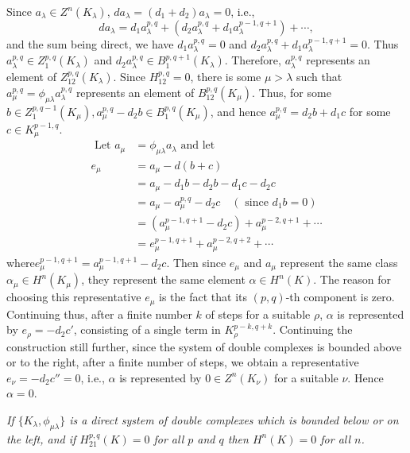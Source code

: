   Since $a_\lambda \in Z^n (K_{\lambda})$,  $d a_\lambda = (d_1 + d_2) 
  a_{\lambda} = 0$, i.e., 
  $$
  d a_{\lambda} = d_1 a^{p,q}_{\lambda} + (d_2 a^{p,q}_{\lambda} + d_1
  a^{p-1, q+1}_{\lambda}) + \cdots , 
  $$
  and the sum being direct, we have $d_1 a^{p,q}_{\lambda} = 0$ and
  $d_2 a^{p,q}_{\lambda} + d_1 a^{p-1 , q+1}_{\lambda} = 0$. Thus
  $a^{p,q}_{\lambda} \in Z^{p,q}_1(K_\lambda)$ and $d_2
  a^{p,q}_{\lambda} \in B^{p,q+1}_{1} (K_\lambda)$. Therefore,
  $a^{p,q}_{\lambda}$ represents an element of
  $Z^{p,q}_{12}(K_\lambda)$. Since $H^{p,q}_{12} = 0$, there is some
  $\mu > \lambda$ such that $a^{p,q}_{\mu} = \phi_{\mu \lambda}
  a^{p,q}_{\lambda}$ represents an element of
  $B^{p,q}_{12}(K_\mu)$. Thus, for some $b \in Z^{p,q-1}_{1}(K_\mu),
  a^{p,q}_{\mu} - d_2 b \in B^{p,q}_1 (K_\mu)$, and hence
  $a^{p,q}_{\mu} = d_2 b + d_1 c$ for some $c \in K^{p-1,q}_{\mu}$. 
  \begin{align*}
\text{ Let } a_{\mu} & = \phi_{\mu \lambda} a_{\lambda} \text{ and
  let } \\ 
e_{\mu} & = a_{\mu }- d (b + c) \\
& = a_{\mu }- d_1 b - d_2 b-d_1 c-d_2 c \\
& = a_{\mu } - a^{p,q}_{\mu} - d_2 c  \quad (\text { since } d_1 b = 0)\\
 &= (a^{p-1,q+1}_\mu - d_2 c) + a^{p-2,q+1}_\mu  + \cdots \\
 & = e^{p-1, q+1}_\mu + a^{p-2,q+2}_\mu  + \cdots
 \end{align*}  
 where\pageoriginale $e^{p-1,q+1}_\mu  = a^{p-1,q+1}_\mu - d_2 c$. Then since
 $e_\mu$ and $a_\mu$ represent the same class $\alpha_{\mu} \in H^n
 (K_\mu)$, they represent the same element $\alpha \in H^n(K)$. The
 reason for choosing this representative $e_\mu$ is the fact that its
 $(p, q)$-th component is zero. Continuing thus, after a finite
 number $k$ of steps for a suitable $\rho$, $\alpha$ is represented by
 $e_\rho = -d_2 c'$, consisting of a single term in $K^{p-k,
   q+k}_\rho$. Continuing the construction still further, since the
 system of double complexes is bounded above or to the right, after a
 finite number of steps, we obtain a representative $e_\nu = - d_2 c''
 = 0$, i.e., $\alpha$ is represented by $0 \in Z^n(K_\nu)$ for a
 suitable $\nu$. Hence $\alpha = 0$. 

\medskip
{}
\textit{If $\bigg\{ K_\lambda , \phi_{\mu \lambda} \bigg\}$ is a direct
  system of double complexes which is bounded below or on the left,
  and if $H^{p,q}_{21} (K) = 0$ for all $p$ and $q$ then $H^n(K)= 0$ for
  all $n$.}
 
